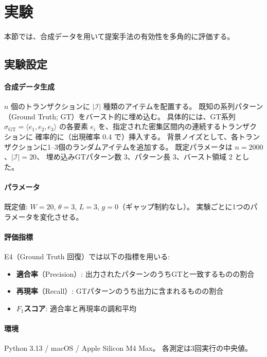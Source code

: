\documentclass[11pt,a4paper]{article}
\begin{document}
\section{実験}
\label{sec:experiments}

本節では、合成データを用いて提案手法の有効性を多角的に評価する。

\subsection{実験設定}

\paragraph{合成データ生成}
$n$ 個のトランザクションに $|\mathcal{I}|$ 種類のアイテムを配置する。
既知の系列パターン（Ground Truth; GT）をバースト的に埋め込む。
具体的には、GT系列 $\sigma_{\mathrm{GT}} = \langle e_1, e_2, e_3 \rangle$
の各要素 $e_i$ を、指定された密集区間内の連続するトランザクションに
確率的に（出現確率 0.4 で）挿入する。
背景ノイズとして、各トランザクションに1--3個のランダムアイテムを追加する。
既定パラメータは $n = 2000$、$|\mathcal{I}| = 20$、
埋め込みGTパターン数 3、パターン長 3、バースト領域 2 とした。

\paragraph{パラメータ}
既定値: $W = 20$, $\theta = 3$, $L = 3$, $g = 0$（ギャップ制約なし）。
実験ごとに1つのパラメータを変化させる。

\paragraph{評価指標}
E4（Ground Truth 回復）では以下の指標を用いる:
\begin{itemize}[leftmargin=1.5em]
  \item \textbf{適合率}（Precision）: 出力されたパターンのうちGTと一致するものの割合
  \item \textbf{再現率}（Recall）: GTパターンのうち出力に含まれるものの割合
  \item \textbf{$F_1$スコア}: 適合率と再現率の調和平均
\end{itemize}

\paragraph{環境}
Python 3.13 / macOS / Apple Silicon M4 Max。
各測定は3回実行の中央値。
\end{document}
